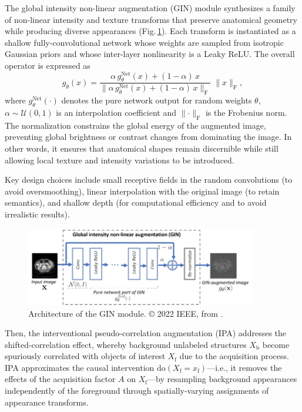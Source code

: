 The global intensity non-linear augmentation (GIN) module synthesizes a family of non-linear intensity and texture transforms that preserve anatomical geometry while producing diverse appearances (Fig.\,\ref{fig:gin_schema}). Each transform is instantiated as a shallow fully-convolutional network whose weights are sampled from isotropic Gaussian priors and whose inter-layer nonlinearity is a Leaky ReLU. The overall operator is expressed as
\begin{equation}\label{eq:gin}
    g_{\theta}(x) = \frac{\alpha\,g^{\mathrm{Net}}_{\theta}(x) + (1-\alpha)\,x}{\lVert \alpha\,g^{\mathrm{Net}}_{\theta}(x) + (1-\alpha)\,x \rVert_\mathrm{F}}\;\lVert x \rVert_\mathrm{F},
\end{equation}
where $g^{\mathrm{Net}}_{\theta}(\cdot)$ denotes the pure network output for random weights $\theta$, $\alpha\sim\mathcal{U}(0,1)$ is an interpolation coefficient and $\lVert\cdot\rVert_\mathrm{F}$ is the Frobenius norm. The normalization constrains the global energy of the augmented image, preventing global brightness or contrast changes from dominating the image. In other words, it ensures that anatomical shapes remain discernible while still allowing local texture and intensity variations to be introduced.

Key design choices include small receptive fields in the random convolutions (to avoid oversmoothing), linear interpolation with the original image (to retain semantics), and shallow depth (for computational efficiency and to avoid irrealistic results).

\begin{figure}[htbp]
    \centering
    \includegraphics[width=0.9\textwidth]{figures/gin_schema.png}
    \caption{Architecture of the GIN module. © 2022 IEEE, from \cite{Ouyang2023}.}
    \label{fig:gin_schema}
\end{figure}

Then, the interventional pseudo-correlation augmentation (IPA) addresses the shifted-correlation effect, whereby background unlabeled structures $X_\mathrm{b}$ become spuriously correlated with objects of interest $X_\mathrm{f}$ due to the acquisition process. IPA approximates the causal intervention $\mathrm{do}(X_\mathrm{f}=x_\mathrm{f})$---i.e., it removes the effects of the acquisition factor $A$ on $X_\mathrm{f}$---by resampling background appearances independently of the foreground through spatially-varying assignments of appearance transforms.

